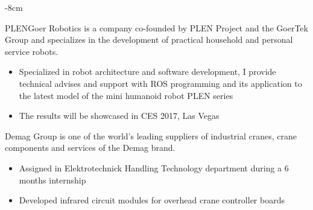 \documentclass[10pt,a4paper]{altacv}
\begin{document}

\begin{adjustwidth}{}{-8cm}
\makecvheader
\end{adjustwidth}


PLENGoer Robotics is a company co-founded by PLEN Project and the GoerTek Group and specializes in the development of practical household and personal service robots.
\begin{itemize}
\item Specialized in robot architecture and software development, I provide technical advises and support with ROS programming and its application to the latest model of the mini humanoid robot PLEN series
\item The results will be showcased in CES 2017, Las Vegas
\end{itemize}

\divider

Demag Group is one of the world's leading suppliers of industrial cranes, crane components and services of the Demag brand.
\begin{itemize}
\item Assigned in Elektrotechnick Handling Technology department during a 6 months internship
\item Developed infrared circuit modules for overhead crane controller boards
\end{itemize}
\end{document}
